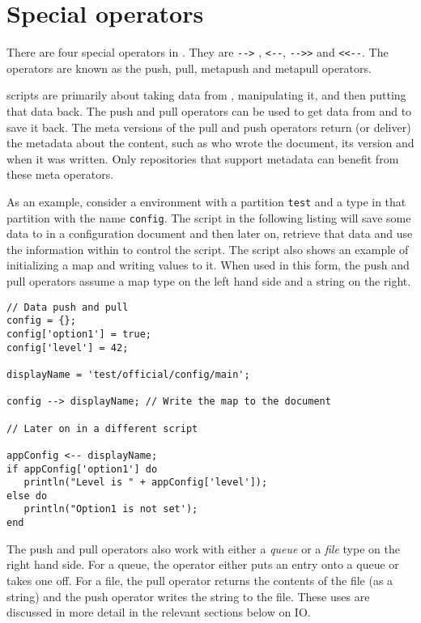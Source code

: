 \chapter{Special operators}
There are four special operators in \Reflex. They are \Verb+-->+ , \verb+<--+, \verb+-->>+ and \verb+<<--+. The operators are known as the push, pull, metapush and metapull operators.

\Reflex scripts are primarily about taking data from \Rapture, manipulating it, and then putting that data back. The push and pull operators can be used to get data from \Rapture and to save it back. The meta versions of the pull and push operators return (or deliver) the metadata about the content, such as who wrote the document, its version and when it was written. Only repositories that support metadata can benefit from these meta operators.

As an example, consider a \Rapture environment with a partition \Verb+test+ and a type in that partition with the name \verb+config+. The script in the following listing will save some data to \Rapture in a configuration document and then later on, retrieve that data and use the information within to control the script. The script also shows an example of initializing a map and writing values to it. When used in this form, the push and pull operators assume a map type on the left hand side and a string on the right.

\begin{lstlisting}[caption={Push and Pull}]
// Data push and pull
config = {};
config['option1'] = true;
config['level'] = 42;

displayName = 'test/official/config/main';

config --> displayName; // Write the map to the document

// Later on in a different script

appConfig <-- displayName;
if appConfig['option1'] do
   println("Level is " + appConfig['level']);
else do
   println("Option1 is not set');
end
\end{lstlisting}

The push and pull operators also work with either a \emph{queue} or a \emph{file} type on the right hand side. For a queue, the operator either puts an entry onto a \Rapture queue or takes one off. For a file, the pull operator returns the contents of the file (as a string) and the push operator writes the string to the file. These uses are discussed in more detail in the relevant sections below on IO.

